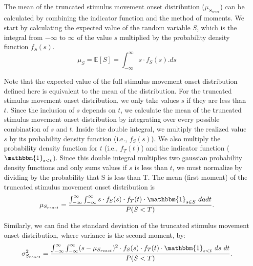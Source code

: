 \documentclass[man,floatsintext,letterpaper,12pt]{apa7}
\begin{document}
The mean of the truncated stimulus movement onset distribution ($\mu_{S_{react}}$) can be calculated by combining the indicator function and the method of moments. We start by calculating the expected value of the random variable $S$, which is the integral from $-\infty$ to $\infty$ of the value $s$ multiplied by the probability density function $f_{S}(s)$.
\begin{equation}
    \mu_{S} = \mathbb{E}[S] = \int_{-\infty}^{\infty}s \cdot f_{S}(s).ds
\end{equation}

Note that the expected value of the full stimulus movement onset distribution defined here is equivalent to the mean of the distribution. For the truncated stimulus movement onset distribution, we only take values $s$ if they are less than $t$. Since the inclusion of $s$ depends on $t$, we calculate the mean of the truncated stimulus movement onset distribution by integrating over every possible combination of $s$ and $t$. Inside the double integral, we multiply the realized value $s$ by its probability density function (i.e., $f_{S}(s)$). We also multiply the probability density function for $t$ (i.e., $f_{T}(t)$) and the indicator function ($\mathbbm{1}_{s<t}$). Since this double integral multiplies two gaussian probability density functions and only sums values if $s$ is less than $t$, we must normalize by dividing by the probability that S is less than T. The mean (first moment) of the truncated stimulus movement onset distribution is
\begin{equation}
    \mu_{S_{react}} = \dfrac{\int_{-\infty}^{\infty}  \int_{-\infty}^{\infty} s \cdot f_{S}(s) \cdot f_{T}(t) \cdot \mathbbm{1}_{s \in S} \ dadt} {P(S<T)}.
\end{equation}

Similarly, we can find the standard deviation of the truncated stimulus movement onset distribution, where variance is the second moment, by:
%
\begin{equation}
    \sigma^2_{S_{react}} = \dfrac{\int_{-\infty}^{\infty}  \int_{-\infty}^{\infty} (s - \mu_{S_{react}})^2 \cdot f_{S}(s) \cdot f_{T}(t) \cdot \mathbbm{1}_{s<t} \ ds \ dt}{P(S<T)}.
\end{equation}
\end{document}
